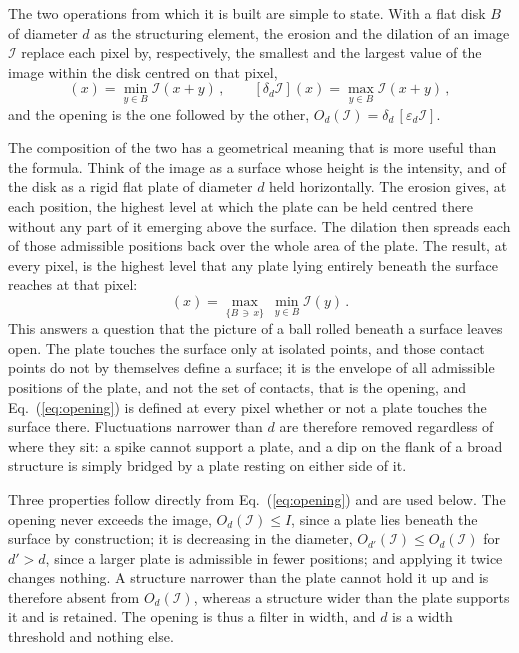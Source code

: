 \documentclass{aa}
\newcommand{\Iim}{\mathcal{I}}
\begin{document}
The two operations from which it is built are simple to state. With a flat
disk $B$ of diameter $d$ as the structuring element, the erosion and the
dilation of an image $\Iim$ replace each pixel by, respectively, the smallest and
the largest value of the image within the disk centred on that pixel,
%
\begin{equation}
   [\varepsilon_d \Iim](x) = \min_{y \in B} \Iim(x+y) \,,
   \qquad
   [\delta_d \Iim](x) = \max_{y \in B} \Iim(x+y) \,,
   \label{eq:erodil}
\end{equation}
%
and the opening is the one followed by the other,
$O_d(\Iim) = \delta_d\,[\varepsilon_d \Iim]$.

The composition of the two has a geometrical meaning that is more useful than
the formula. Think of the image as a surface whose height is the intensity, and
of the disk as a rigid flat plate of diameter $d$ held horizontally. The erosion
gives, at each position, the highest level at which the plate can be held
centred there without any part of it emerging above the surface. The dilation
then spreads each of those admissible positions back over the whole area of the
plate. The result, at every pixel, is the highest level that any plate lying
entirely beneath the surface reaches at that pixel:
%
\begin{equation}
   [O_d \Iim](x) = \max_{\{B\,\ni\,x\}}\ \min_{y \in B} \Iim(y) \,.
   \label{eq:opening}
\end{equation}
%
This answers a question that the picture of a ball rolled beneath a surface
leaves open. The plate touches the surface only at isolated points, and those
contact points do not by themselves define a surface; it is the envelope of all
admissible positions of the plate, and not the set of contacts, that is the
opening, and Eq.~(\ref{eq:opening}) is defined at every pixel whether or not a
plate touches the surface there. Fluctuations narrower than $d$ are therefore
removed regardless of where they sit: a spike cannot support a plate, and a
dip on the flank of a broad structure is simply bridged by a plate resting on
either side of it.

Three properties follow directly from Eq.~(\ref{eq:opening}) and are used
below. The opening never exceeds the image, $O_d(\Iim) \le I$, since a plate lies
beneath the surface by construction; it is decreasing in the diameter,
$O_{d'}(\Iim) \le O_d(\Iim)$ for $d' > d$, since a larger plate is admissible in
fewer positions; and applying it twice changes nothing. A structure narrower
than the plate cannot hold it up and is therefore absent from $O_d(\Iim)$, whereas
a structure wider than the plate supports it and is retained. The opening is
thus a filter in width, and $d$ is a width threshold and nothing else.
\end{document}
